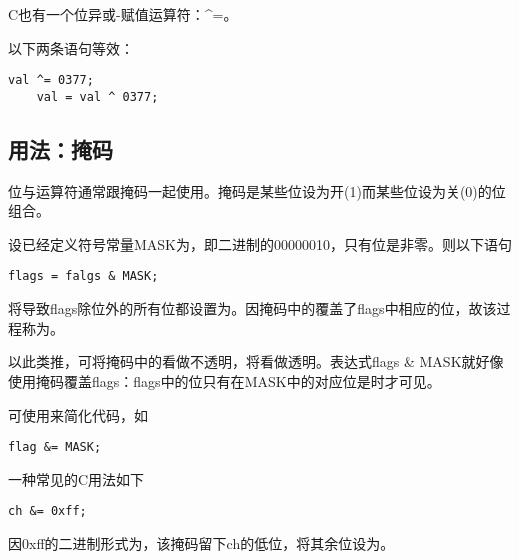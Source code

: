 \begin{frame}[fragile]

  \begin{zhu}
    C也有一个位异或-赋值运算符：{\tf \^{}=}。
  \end{zhu}
  以下两条语句等效：
  \begin{lstlisting}[backgroundcolor=\color{red!20}]
    val ^= 0377;
    val = val ^ 0377;
  \end{lstlisting}
\end{frame}


\subsection{用法：掩码}
\begin{frame}
  位与运算符通常跟掩码一起使用。掩码是某些位设为开{\tf (1)}而某些位设为关{\tf (0)}的位组合。
\end{frame}

\begin{frame}[fragile]
  \begin{li}
    设已经定义符号常量{\tf MASK}为{}，即二进制的{00000010}，只有位{}是非零。则以下语句
    \begin{lstlisting}[backgroundcolor=\color{red!20}]
      flags = falgs & MASK;
    \end{lstlisting}
    将导致{\tf flags}除位{}外的所有位都设置为{}。因掩码中的{}覆盖了{\tf flags}中相应的位，故该过程称为。
  \end{li}
\end{frame}

\begin{frame}[fragile]
  以此类推，可将掩码中的{}看做不透明，将{}看做透明。表达式{\tf flags \& MASK}就好像使用掩码覆盖{\tf flags}：{\tf flags}中的位只有在{\tf MASK}中的对应位是{}时才可见。
\end{frame}

\begin{frame}[fragile]
  可使用来简化代码，如
  \begin{lstlisting}[backgroundcolor=\color{red!20}]
    flag &= MASK;
  \end{lstlisting}
  \pause \vspace{.1in}

  一种常见的C用法如下
  \begin{lstlisting}[backgroundcolor=\color{red!20}]
    ch &= 0xff;
  \end{lstlisting}
  因{\tf 0xff}的二进制形式为{}，该掩码留下{\tf ch}的低{}位，将其余位设为{}。
\end{frame}



